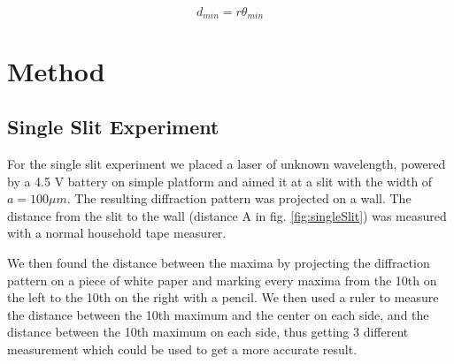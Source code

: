 \documentclass{emulateapj}
\begin{document}
\begin{equation}
d_{min} = r\theta_{min}
\end{equation}\label{eq:skinny}

\section{Method}
\label{sec:method}


\subsection{Single Slit Experiment}
For the single slit experiment we placed a laser of unknown wavelength, powered by a 4.5 V battery on simple platform and aimed it at a slit with the width of  $a = 100\mu m$. The resulting diffraction pattern was projected on a wall. The distance from the slit to the wall (distance A in fig. \ref{fig:singleSlit}) was measured with a normal household tape measurer.

We then found the distance between the maxima by projecting the diffraction pattern on a piece of white paper and marking every maxima from the 10th on the left to the 10th on the right with a pencil. We then used a ruler to measure the distance between the 10th maximum and the center on each side, and the distance between the 10th maximum on each side, thus getting 3 different measurement which could be used to get a more accurate result.\\
\end{document}
